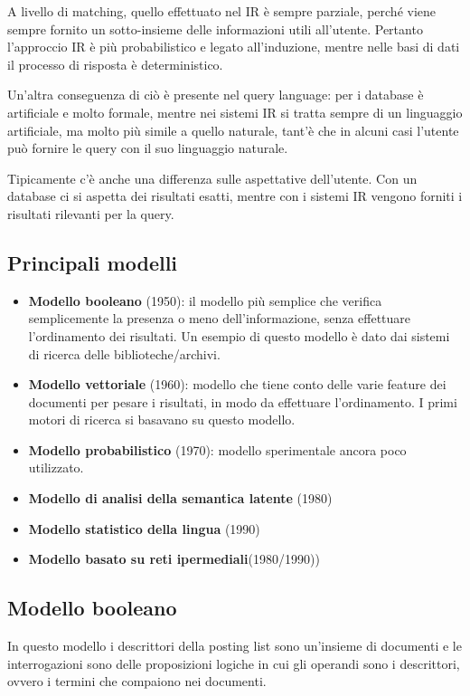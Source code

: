 A livello di matching, quello effettuato nel IR è sempre parziale, perché viene sempre fornito un sotto-insieme delle informazioni utili all'utente.
Pertanto l'approccio IR è più probabilistico e legato all'induzione, mentre nelle basi di dati il processo di risposta è deterministico.

Un'altra conseguenza di ciò è presente nel query language: per i database è artificiale e molto formale, mentre nei sistemi IR si tratta sempre di un linguaggio artificiale, ma molto più simile a quello naturale, tant'è che in alcuni casi l'utente può fornire le query con il suo linguaggio naturale.

Tipicamente c'è anche una differenza sulle aspettative dell'utente.
Con un database ci si aspetta dei risultati esatti, mentre con i sistemi IR vengono forniti i risultati rilevanti per la query.

\subsection{Principali modelli}

\begin{itemize}
	\item \textbf{Modello booleano} (1950): il modello più semplice che verifica semplicemente la presenza o meno dell'informazione, senza effettuare l'ordinamento dei risultati. Un esempio di questo modello è dato dai sistemi di ricerca delle biblioteche/archivi.
	\item \textbf{Modello vettoriale} (1960): modello che tiene conto delle varie feature dei documenti per pesare i risultati, in modo da effettuare l'ordinamento. I primi motori di ricerca si basavano su questo modello.
	\item \textbf{Modello probabilistico} (1970): modello sperimentale ancora poco utilizzato.
	\item \textbf{Modello di analisi della semantica latente} (1980)
	\item \textbf{Modello statistico della lingua} (1990)
	\item \textbf{Modello basato su reti ipermediali}(1980/1990))
\end{itemize}

\subsection{Modello booleano}


In questo modello i descrittori della posting list sono un'insieme di documenti e le interrogazioni sono delle proposizioni logiche in cui gli operandi sono i descrittori, ovvero i termini che compaiono nei documenti.

